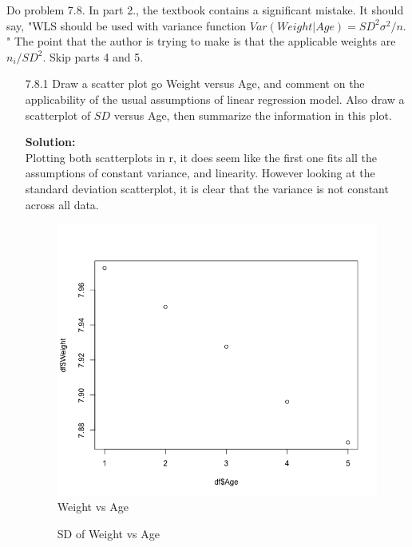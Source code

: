 \documentclass[12pt]{article}
\makeatletter
\theoremstyle{homework}
\newenvironment{exercise}[1]
{\def\@currentlabel{#1}\exercisecore}
{\endexercisecore}
\newcommand{\localhead}[1]{\par\smallskip\noindent\textbf{#1}\nobreak\\}%
\newcommand\solution{\localhead{Solution:}}
\makeatother
\begin{document}
\begin{exercise}{1} Do problem 7.8. In part 2., the textbook contains a significant mistake. It should say, "WLS should be used 
  with variance function $Var(Weight|Age) = SD^2\sigma^2/n$. " The point that the author is trying to make is that the applicable weights 
  are $n_i/SD^2$. Skip parts 4 and 5.\\
  \begin{enumerate}
    \item[7.8.1] Draw a scatter plot go Weight versus Age, and comment on the applicability of the usual assumptions of linear regression 
    model. Also draw a scatterplot of $SD$ versus Age, then summarize the information in this plot. \\
    \solution Plotting both scatterplots in r, it does seem like the first one fits all the assumptions of constant variance, and linearity. However 
    looking at the standard deviation scatterplot, it is clear that the variance is not constant across all data.\\
    \begin{figure}[H]
      \begin{center}
      \caption{Weight vs Age}
      \includegraphics[width = \textwidth]{Rplot.png}
      \end{center}
    \end{figure}
    \begin{figure}[H]
      \begin{center}
      \caption{SD of Weight vs Age}

\end{center}
\end{figure}
\end{enumerate}
\end{exercise}
\end{document}
